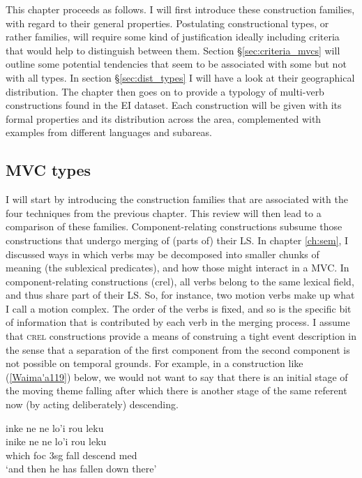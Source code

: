 This chapter proceeds as follows. I will first introduce these construction families, with regard to their general properties. Postulating constructional types, or rather families, will require some kind of justification ideally including criteria that would help to distinguish between them. Section §\ref{sec:criteria_mvcs} will outline some potential tendencies that seem to be associated with some but not with all types. In section §\ref{sec:dist_types} I will have a look at their geographical distribution. The chapter then goes on to provide a typology of multi-verb constructions found in  the EI dataset. Each construction will be given with its formal properties and its distribution across the area, complemented with examples from different languages and subareas. 

\subsection{MVC types} \label{sec:mvc-types}

I will start by introducing the construction families that are associated with the four techniques from the previous chapter. This review will then lead to a comparison of these families. Component-relating constructions subsume those constructions that undergo merging of (parts of) their LS. In chapter \ref{ch:sem}, I  discussed ways in which verbs may be decomposed into smaller chunks of meaning (the sublexical predicates), and how those might interact in a MVC. In component-relating constructions (\acs{crel}), all verbs belong to the same lexical field, and thus share part of their LS. So, for instance, two motion verbs make up what I call a motion complex. The order of the verbs is fixed, and so is the specific bit of information that is contributed by each verb in the merging process. I assume that \textsc{crel} constructions provide a means of construing a tight event description in the sense that a separation of the first component from the second component is not possible on temporal grounds. For example, in a construction like (\ref{Waima'a119}) below, we would not want to say that there is an initial stage of the moving theme falling after which there is another stage of the same referent now (by acting deliberately) descending. 

\ea \label{Waima'a119}
\gll inke ne ne lo'i rou leku \\
inike ne ne lo'i rou leku \\
\glc which \acs{foc} \acs{3}\acs{sg} fall descend \acs{med} \\
\glft `and then he has fallen down there' \\ 
\z
\xe

